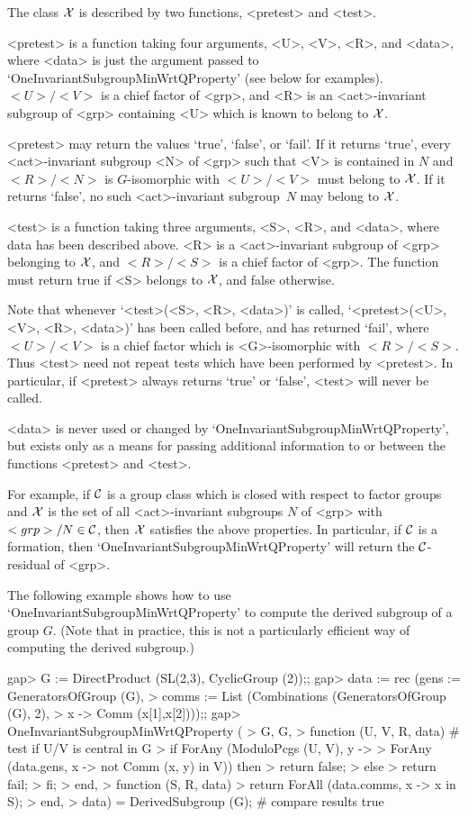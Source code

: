 The class $\cal X$ is described by two functions, <pretest> and <test>. 

<pretest> is a function taking four arguments, <U>, <V>, <R>, and <data>,
where <data> is just the argument passed to
`OneInvariantSubgroupMinWrtQProperty' (see below for examples). $<U>/<V>$ is a
chief factor of <grp>, and  <R> is an <act>-invariant subgroup of <grp> containing <U>
which is known to belong to
$\cal X$.

<pretest> may return the values `true', `false', or `fail'. If it returns 
`true', every <act>-invariant subgroup <N> of <grp> such that <V> is
contained in $N$ and $<R>/<N>$ is
$G$-isomorphic with $<U>/<V>$ must belong to $\cal X$. If it returns
`false', no such <act>-invariant subgroup~$N$ may belong to $\cal X$. 

<test> is a function taking three arguments, <S>, <R>, and <data>, where
data has been described above. <R> is a <act>-invariant subgroup of <grp> belonging to
$\cal X$, and $<R>/<S>$ is a chief factor of <grp>. The function must return
true if <S> belongs to $\cal X$, and false otherwise. 

Note that whenever `<test>(<S>, <R>, <data>)' is called, 
`<pretest>(<U>, <V>, <R>, <data>)' has been called before, and has returned
`fail', where  $<U>/<V>$ is a  chief factor which is <G>-isomorphic with
$<R>/<S>$. Thus <test> need not repeat tests which have been performed by
<pretest>. In particular, if <pretest> always returns `true' or `false',
<test> will never be called.

<data> is never used or changed by `OneInvariantSubgroupMinWrtQProperty', but
exists only as a means for passing additional information to or between
the functions <pretest> and <test>.

For example, if $\cal C$ is a group class which is closed with respect to
factor groups and $\cal X$ is the set of all <act>-invariant subgroups $N$ of <grp>
with $<grp>/N \in \cal C$, then $\cal X$ satisfies the above properties. In
particular, if $\cal C$ is a formation, then
`OneInvariantSubgroupMinWrtQProperty' will return the $\cal C$-residual of
<grp>.

The following example shows how to use `OneInvariantSubgroupMinWrtQProperty' to
compute the derived subgroup of a group $G$. (Note that in practice, this 
is not a particularly efficient way of computing the derived subgroup.)

\beginexample
gap> G := DirectProduct (SL(2,3), CyclicGroup (2));;
gap> data := rec (gens := GeneratorsOfGroup (G),
>    comms := List (Combinations (GeneratorsOfGroup (G), 2), 
>       x -> Comm (x[1],x[2])));;
gap> OneInvariantSubgroupMinWrtQProperty (
>    G, G,
>    function (U, V, R, data) # test if U/V is central in G
>        if ForAny (ModuloPcgs (U, V), y ->
>           ForAny (data.gens, x -> not Comm (x, y) in V)) then 
>           return false;
>        else
>           return fail;
>        fi;
>     end,
>     function (S, R, data)
>        return ForAll (data.comms, x -> x in S);
>     end,
>     data) = DerivedSubgroup (G); # compare results
true
\endexample       


